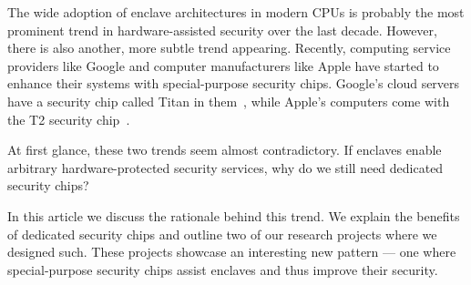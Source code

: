 The wide adoption of enclave architectures in modern CPUs is probably the most prominent trend in hardware-assisted security over the last decade. However, there is also another, more subtle trend appearing. Recently, computing service providers like Google and computer manufacturers like Apple have started to enhance their systems with special-purpose security chips. Google's cloud servers have a security chip called Titan in them~\cite{titan}, while Apple's computers come with the T2 security chip~\cite{t2}. 

At first glance, these two trends seem almost contradictory. If enclaves enable arbitrary hardware-protected security services, why do we still need dedicated security chips? 

In this article we discuss the rationale behind this trend. We explain the benefits of dedicated security chips and outline two of our research projects where we designed such. These projects showcase an interesting new pattern --- one where special-purpose security chips assist enclaves and thus improve their security. 
